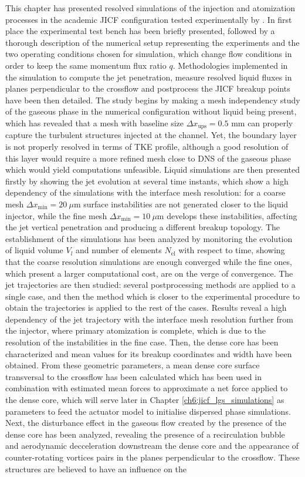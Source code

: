 This chapter has presented resolved simulations of the injection and atomization processes in the academic JICF configuration tested experimentally by . In first place the experimental test bench has been briefly presented, followed by a thorough description of the numerical setup representing the experiments and the two operating conditions chosen for simulation, which change flow conditions in order to keep the same momentum flux ratio $q$. Methodologies implemented in the simulation to compute the jet penetration, measure resolved liquid fluxes in planes perpendicular to the crossflow and postprocess the JICF breakup points have been then detailed. The study begins by making a mesh independency study of the gaseous phase in the numerical configuration without liquid being present, which has revealed that a mesh with baseline size $\Delta x_\mathrm{ups} = 0.5$ mm can properly capture the turbulent structures injected at the channel. Yet, the boundary layer is not properly resolved in terms of TKE profile, although a good resolution of this layer would require a more refined mesh close to DNS of the gaseous phase which would yield computations unfeasible. Liquid simulations are then presented firstly by showing the jet evolution at several time instants, which show a high dependency of the simulations with the interface mesh resolution: for a coarse mesh $\Delta x_\mathrm{min} = 20~\mu$m surface instabilities are not generated closer to the liquid injector, while the fine mesh $\Delta x_\mathrm{min} = 10~\mu$m develops these instabilities, affecting the jet vertical penetration and producing a different breakup topology. The establishment of the simulations has been analyzed by monitoring the evolution of liquid volume $V_l$ and number of elements $N_\mathrm{el}$ with respect to time, showing that the coarse resolution simulations are enough converged while the fine ones, which present a larger computational cost, are on the verge of convergence. The jet trajectories are then studied: several postprocessing methods are applied to a single case, and then the method which is closer to the experimental procedure to obtain the trajectories is applied to the rest of the cases. Results reveal a high dependency of the jet trajectory with the interface mesh resolution further from the injector, where primary atomization is complete, which is due to the resolution of the instabilities in the fine case. Then, the dense core has been characterized and mean values for its breakup coordinates and width have been obtained. From these geometric parameters, a mean dense core surface transversal to the crossflow has been calculated which has been used in combination with estimated mean forces to approximate a net force applied to the dense core, which will serve later in Chapter \ref{ch6:jicf_lgs_simulations} as parameters to feed the actuator model to initialise dispersed phase simulations. Next, the disturbance effect in the gaseous flow created by the presence of the dense core has been analyzed, revealing the presence of a recirculation bubble and aerodynamic decceleration downstream the dense core and the appearance of counter-rotating vortices pairs in the planes perpendicular to the crossflow. These structures are believed to have an influence on the 